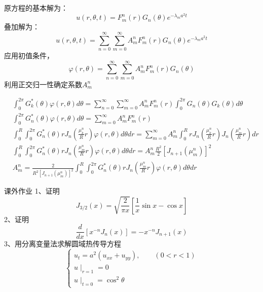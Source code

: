	原方程的基本解为：
	\begin{equation*}
		u(r,\theta,t) =F_m ^n (r) G_n(\theta) e^{-\lambda_m a^2 t}
	\end{equation*}
	叠加解为：
	\begin{equation*}
		u(r,\theta,t) =\sum_{n=0}^{\infty} \sum_{m=0}^{\infty} A_m ^n F_m ^n (r) G_n(\theta) e^{-\lambda_m a^2 t}
	\end{equation*}
	应用初值条件， 
	\begin{equation*}
		\varphi(r, \theta)=\sum_{n=0}^{\infty} \sum_{m=0}^{\infty} A_m ^n F_m ^n (r) G_n(\theta) 
	\end{equation*}
	利用正交归一性确定系数$A_m ^n$



	\begin{equation*}
		\begin{split}
				 &\int_0 ^{2\pi} G_k ^* (\theta) \varphi(r, \theta) d\theta =\sum_{n=0}^{\infty} \sum_{m=0}^{\infty} A_m ^n F_m ^n (r) \int_0 ^{2\pi} G_n(\theta) G_k(\theta) d\theta	\\ 
				 &\int_0 ^{2\pi} G_n  ^* (\theta) \varphi(r, \theta) d\theta = \sum_{m=0}^{\infty} A_m ^n F_m ^n (r)\\ 
				 &\int_0 ^{R} \int_0 ^{2\pi} G_n ^* (\theta) r J_n (\frac{\mu_{k}^{n}}{R}r) \varphi(r, \theta) d\theta dr = \sum_{m=0}^{\infty} A_m ^n \int_0 ^{R} r J_n (\frac{\mu_{k}^{n}}{R}r)J_n (\frac{\mu_{m}^{n}}{R}r) dr \\
				 &\int_0 ^{R} \int_0 ^{2\pi} G_n ^* (\theta) r J_n (\frac{\mu_{m}^{n}}{R}r) \varphi(r, \theta) d\theta dr = A_m ^n \frac{R^2}{2} [J_{n+1}(\mu_m ^n)]^2\\ 
				 &A_m ^n=	\frac{2}{R^2[J_{n+1}(\mu_m ^n)]^2} \int_0 ^{R} \int_0 ^{2\pi} G_n ^* (\theta) r J_n (\frac{\mu_{m}^{n}}{R}r) \varphi(r, \theta) d\theta dr 
		\end{split}
	\end{equation*}



	{课外作业}
	1、证明 
	\begin{equation*}
		J_{3/2}(x)=\sqrt{\frac{2}{\pi x}} [\frac{1}{x}\sin x -\cos x]
	\end{equation*}
	2、证明
	\begin{equation*}
		\frac{d}{d x}\left[x^{-n} J_{n}(x)\right]=-x^{-n} J_{n+1}(x) 
	\end{equation*}	
	3、用分离变量法求解圆域热传导方程
	\[\begin{cases}
		u_t=a^2 (u_{xx}+u_{yy}), \qquad (0<r<1) \\
		u\mid_{r=1}=0 \\
		u\mid_{t=0}=\cos^2\theta
	\end{cases}\]	

